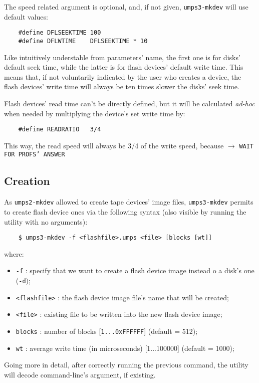 \documentclass[12pt,a4paper,openright,twoside]{report}
\begin{document}
	The speed related argument is optional, and, if not given, \texttt{umps3-mkdev} will use default values:
	\begin{verbatim}
	#define DFLSEEKTIME 100
	#define DFLWTIME    DFLSEEKTIME * 10
	\end{verbatim}
	Like intuitively understable from parameters' name, the first one is for disks' default seek time, while the latter is for flash devices' default write time. This means that, if not voluntarily indicated by the user who creates a device, the flash devices' write time will always be ten times slower the disks' seek time.
	
	Flash devices' read time can't be directly defined, but it will be calculated \textit{ad-hoc} when needed by multiplying the device's set write time by: 
	\begin{verbatim}
	#define READRATIO   3/4
	\end{verbatim}
	This way, the read speed will always be 3/4 of the write speed, because $\to$ \texttt{WAIT FOR PROFS' ANSWER}
	
\subsection{Creation}
	As \texttt{umps2-mkdev} allowed to create tape devices' image files, \texttt{umps3-mkdev} permits to create flash device ones via the following syntax (also visible by running the utility with no arguments):
	\begin{verbatim}
	$ umps3-mkdev -f <flashfile>.umps <file> [blocks [wt]]
	\end{verbatim}
	where:
	\begin{itemize}
	\item	\texttt{-f} : specify that we want to create a flash device image instead o a disk's one (\texttt{-d});
	\item	\texttt{<flashfile>} : the flash device image file's name that will be created;
	\item	\texttt{<file>} : existing file to be written into the new flash device image;
	\item	\texttt{blocks} : number of blocks [\texttt{1...0xFFFFFF}] (default = 512);
	\item	\texttt{wt} : average write time (in microseconds) [1...100000] (default = 1000);
	\end{itemize}
	Going more in detail, after correctly running the previous command, the utility will decode command-line's argument, if existing.
	
\end{document}
